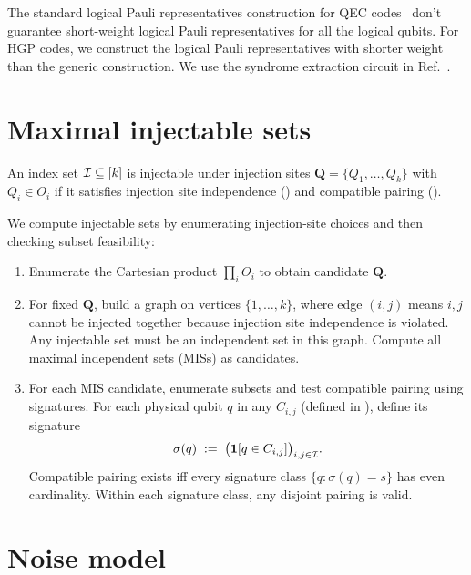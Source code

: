 The standard logical Pauli representatives construction for QEC codes~\cite[Sec.~4.1]{gottesman_stabilizer_1997}
don't guarantee short-weight logical Pauli representatives for all the logical qubits.
For HGP codes, we construct the logical Pauli representatives with shorter weight than the generic construction.
We use the syndrome extraction circuit in Ref.~\cite{xu_constant-overhead_2023}.

\section{Maximal injectable sets}
\label{sec:maximal-injectable-sets}

An index set $\mathcal{I} \subseteq [k]$ is injectable under injection sites
$\bm Q=\{Q_1,\dots,Q_k\}$ with $Q_i\in O_i$ if it satisfies
injection site independence ()
and compatible pairing ().

We compute injectable sets by enumerating injection-site choices and then checking subset feasibility:
\begin{enumerate}
\item Enumerate the Cartesian product $\prod_i O_i$ to obtain candidate $\bm Q$.

\item For fixed $\bm Q$, build a graph on vertices $\{1,\dots,k\}$, where edge $(i,j)$ means $i,j$ cannot be injected together because injection site independence is violated.
Any injectable set must be an independent set in this graph.
Compute all maximal independent sets (MISs) as candidates.

\item For each MIS candidate, enumerate subsets and test compatible pairing using signatures.
For each physical qubit $q$ in any $C_{i,j}$ (defined in ), define its signature
\begin{equation}
\sigma(q) \;:=\; \bigl(\mathbf 1[q\in C_{i,j}]\bigr)_{i,j\in\mathcal{I}}.
\label{eq:signature-def}
\end{equation}
Compatible pairing exists iff every signature class $\{q:\sigma(q)=s\}$ has even cardinality.
Within each signature class, any disjoint pairing is valid.
\end{enumerate}

\section{Noise model}

